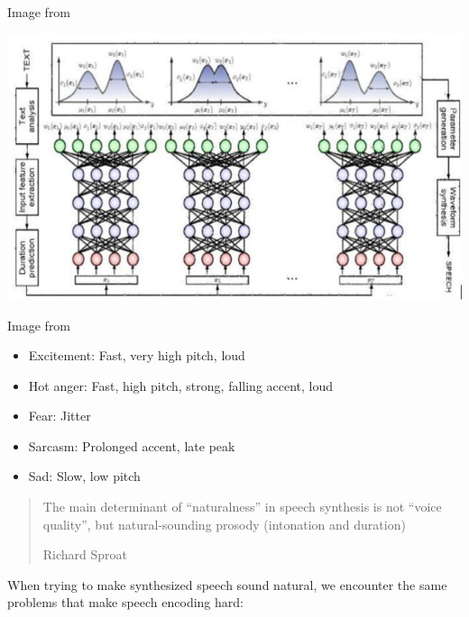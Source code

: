 \documentclass[a4paper,landscape,headrule,footrule,xetex]{foils}
\begin{document}
Image from \citep[Figure 7]{Khanam:Munmun:Ritu:Saha:Mridha:2022}


\noindent\includegraphics[height=0.9\textheight]{../pics/Overview-of-a-deep-MDN-DMDN-43-The-red-circles-represent-the-input-the-blue-circles_W640.jpg}

Image from \citep[Figure 6]{Khanam:Munmun:Ritu:Saha:Mridha:2022}


\begin{itemize}
\item Excitement: Fast, very high pitch, loud
\item Hot anger: Fast, high pitch, strong, falling accent, loud
\item Fear: Jitter
\item Sarcasm: Prolonged accent, late peak
\item Sad: Slow, low pitch
\end{itemize}

\begin{quote}
  The main determinant of ``naturalness'' in speech synthesis is not
  ``voice quality'', but natural-sounding prosody (intonation and
  duration) 
  \begin{flushright}
    Richard Sproat
  \end{flushright}
\end{quote}

 When trying to make synthesized
speech sound natural, we encounter the same problems that make
speech encoding hard:
\end{document}
